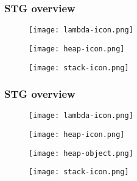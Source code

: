\documentclass[bigger,aspectratio=169]{beamer}
\begin{document}
\begin{frame}[fragile]
\frametitle{STG overview}
\begin{center}

	\begin{minipage}{0.25\textwidth}
		\begin{figure}
			\texttt{[image: lambda-icon.png]}
		\end{figure}
	\end{minipage}
	\hfill
	\begin{minipage}{0.30\textwidth}
		\begin{figure}
			\texttt{[image: heap-icon.png]}
		\end{figure}
	\end{minipage}
	\hfill
	\begin{minipage}{0.30\textwidth}
		\begin{figure}
			\texttt{[image: stack-icon.png]}
		\end{figure}
	\end{minipage}

\end{center}
\end{frame}

\begin{frame}[fragile]
\frametitle{STG overview}
\begin{center}

	\begin{minipage}{0.15\textwidth}
		\begin{figure}
			\texttt{[image: lambda-icon.png]}
		\end{figure}
	\end{minipage}
	\hfill
	\begin{minipage}{0.30\textwidth}
		\vspace{1cm}
		\begin{figure}
			\texttt{[image: heap-icon.png]}
		\end{figure}
		\vspace{-1cm}
		\begin{figure}
			\texttt{[image: heap-object.png]}
		\end{figure}
	\end{minipage}
	\hfill
	\begin{minipage}{0.30\textwidth}
		\begin{figure}
			\texttt{[image: stack-icon.png]}
		\end{figure}
	\end{minipage}

\end{center}
\end{frame}
\end{document}
